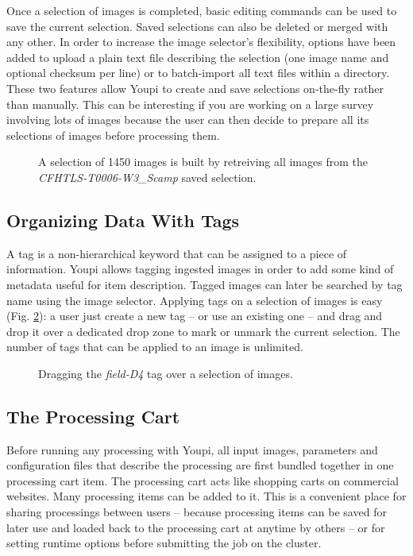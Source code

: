 \documentclass[11pt,twoside]{article}  %
\begin{document}
Once a selection of images is completed, basic editing commands can be used to save the current 
selection. Saved selections can also be deleted or merged with any other. In order to increase the 
image selector's flexibility, options have been added to upload a plain text file describing the 
selection (one image name and optional checksum per line) or to batch-import all text files within 
a directory. These two features allow Youpi to create and save selections on-the-fly rather than 
manually. This can be interesting if you are working on a large survey involving lots of images 
because the user can then decide to prepare all its selections of images before processing them.

\begin{figure}[h]
\caption{A selection of 1450 images is built by retreiving all images from the 
\emph{CFHTLS-T0006-W3\_Scamp} saved selection.}\label{fig:ims}
\end{figure}

\subsection{Organizing Data With Tags}

A tag is a non-hierarchical keyword that can be assigned to a piece of information. Youpi allows 
tagging ingested images in order to add some kind of metadata useful for item description. Tagged 
images can later be searched by tag name using the image selector. Applying tags on a selection of 
images is easy (Fig. \ref{fig:tags}): a user just create a new tag -- or use an existing one -- and 
drag and drop it over a dedicated drop zone to mark or unmark the current selection. The number 
of tags that can be applied to an image is unlimited.

\begin{figure}[h]
\caption{Dragging the \emph{field-D4} tag over a selection of images.}\label{fig:tags}
\end{figure}

\subsection{The Processing Cart}

Before running any processing with Youpi, all input images, parameters and configuration files 
that describe the processing are first bundled together in one processing cart item. The 
processing cart acts like shopping carts on commercial websites. Many processing items can be 
added to it. This is a convenient place for sharing processings between users -- because processing 
items can be saved for later use and loaded back to the processing cart at anytime by others -- or 
for setting runtime options before submitting the job on the cluster.
\end{document}
